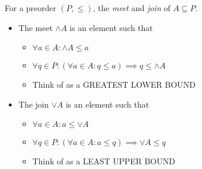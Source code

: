 

For a preorder $(P, \leq)$, the \emph{meet} and \emph{join} of $A \subseteq P$.

\begin{itemize}
    \item The meet $\wedge A$ is an element such that
          \begin{itemize}
            \item $\forall a \in A: \wedge A \leq a$
            \item $\forall q \in P: (\forall a \in A: q \leq a) \implies q \leq \wedge A$
            \item Think of as a GREATEST LOWER BOUND
          \end{itemize}
    \item The join $\vee A$ is an element such that
          \begin{itemize}
            \item $\forall a \in A: a \leq \vee A$
            \item $\forall q \in P: (\forall a \in A: a \leq q) \implies \vee A \leq q$
            \item Think of as a LEAST UPPER BOUND
          \end{itemize}
  \end{itemize}